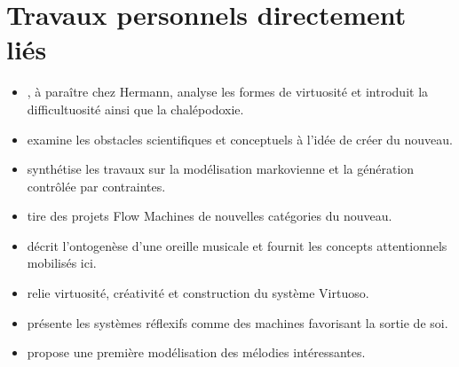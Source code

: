 \documentclass[11pt,a4paper]{article}
\begin{document}
\section{Travaux personnels directement liés}

\begin{itemize}
  \item \textcite{pachet2027virtuosite}, à paraître chez Hermann, analyse les
        formes de virtuosité et introduit la difficultuosité ainsi que la
        chalépodoxie.
  \item \textcite{pachet2026impossibilite} examine les obstacles scientifiques
        et conceptuels à l'idée de créer du nouveau.
  \item \textcite{pachet2026markov} synthétise les travaux sur la modélisation
        markovienne et la génération contrôlée par contraintes.
  \item \textcite{pachet2021assisted} tire des projets Flow Machines de nouvelles
        catégories du nouveau.
  \item \textcite{pachet2018oreille} décrit l'ontogenèse d'une oreille musicale
        et fournit les concepts attentionnels mobilisés ici.
  \item \textcite{pachet2012virtuosity} relie virtuosité, créativité et
        construction du système Virtuoso.
  \item \textcite{pachet2008machines} présente les systèmes réflexifs comme des
        machines favorisant la sortie de soi.
  \item \textcite{pachet2006clefs} propose une première modélisation des mélodies
        intéressantes.
\end{itemize}

\printbibliography[title={Références}]
\end{document}
